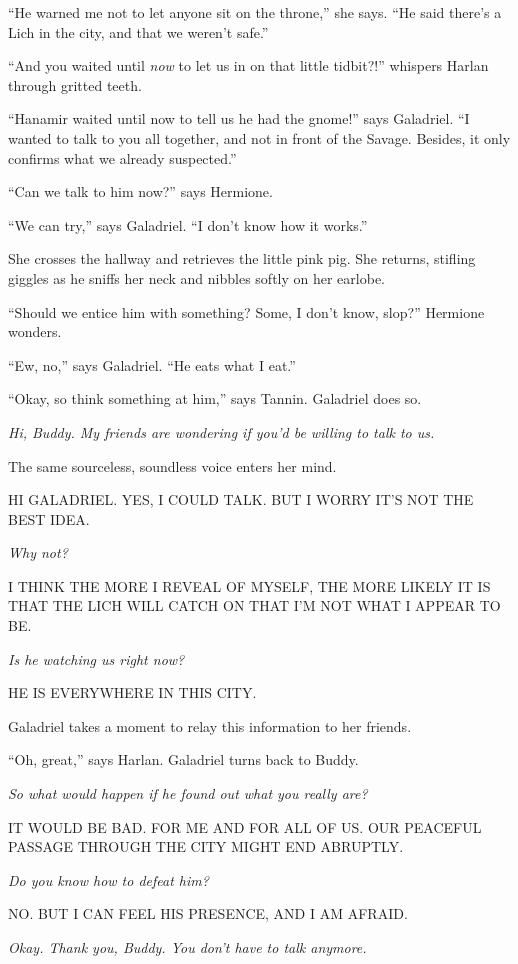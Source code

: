 \documentclass[smalldemyvopaper,11pt,twoside,onecolumn,openright,extrafontsizes]{memoir}
\begin{document}
``He warned me not to let anyone sit on the throne,'' she says. ``He
said there's a Lich in the city, and that we weren't safe.''

``And you waited until \emph{now} to let us in on that little tidbit?!''
whispers Harlan through gritted teeth.

``Hanamir waited until now to tell us he had the gnome!'' says
Galadriel. ``I wanted to talk to you all together, and not in front of
the Savage. Besides, it only confirms what we already suspected.''

``Can we talk to him now?'' says Hermione.

``We can try,'' says Galadriel. ``I don't know how it works.''

She crosses the hallway and retrieves the little pink pig. She returns,
stifling giggles as he sniffs her neck and nibbles softly on her
earlobe.

``Should we entice him with something? Some, I don't know, slop?''
Hermione wonders.

``Ew, no,'' says Galadriel. ``He eats what I eat.''

``Okay, so think something at him,'' says Tannin. Galadriel does so.

\emph{Hi, Buddy. My friends are wondering if you'd be willing to talk to
us.}

The same sourceless, soundless voice enters her mind.

HI GALADRIEL. YES, I COULD TALK. BUT I WORRY IT'S NOT THE BEST IDEA.

\emph{Why not?}

I THINK THE MORE I REVEAL OF MYSELF, THE MORE LIKELY IT IS THAT THE LICH
WILL CATCH ON THAT I'M NOT WHAT I APPEAR TO BE.

\emph{Is he watching us right now?}

HE IS EVERYWHERE IN THIS CITY.

Galadriel takes a moment to relay this information to her friends.

``Oh, great,'' says Harlan. Galadriel turns back to Buddy.

\emph{So what would happen if he found out what you really are?}

IT WOULD BE BAD. FOR ME AND FOR ALL OF US. OUR PEACEFUL PASSAGE THROUGH
THE CITY MIGHT END ABRUPTLY.

\emph{Do you know how to defeat him?}

NO. BUT I CAN FEEL HIS PRESENCE, AND I AM AFRAID.

\emph{Okay. Thank you, Buddy. You don't have to talk anymore.}
\end{document}
